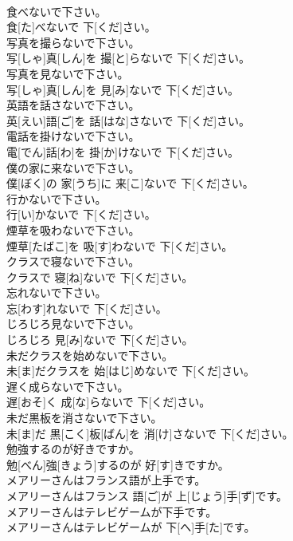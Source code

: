 \documentclass[8pt]{extreport}
\begin{document}
\begin{CJK}{UTF8}{min}
\\	食べないで下さい。	
\\	食[た]べないで 下[くだ]さい。
\\	写真を撮らないで下さい。	
\\	写[しゃ]真[しん]を 撮[と]らないで 下[くだ]さい。
\\	写真を見ないで下さい。	
\\	写[しゃ]真[しん]を 見[み]ないで 下[くだ]さい。
\\	英語を話さないで下さい。	
\\	英[えい]語[ご]を 話[はな]さないで 下[くだ]さい。
\\	電話を掛けないで下さい。	
\\	電[でん]話[わ]を 掛[か]けないで 下[くだ]さい。
\\	僕の家に来ないで下さい。	
\\	僕[ぼく]の 家[うち]に 来[こ]ないで 下[くだ]さい。
\\	行かないで下さい。	
\\	行[い]かないで 下[くだ]さい。
\\	煙草を吸わないで下さい。	
\\	煙草[たばこ]を 吸[す]わないで 下[くだ]さい。
\\	クラスで寝ないで下さい。	
\\	クラスで 寝[ね]ないで 下[くだ]さい。
\\	忘れないで下さい。	
\\	忘[わす]れないで 下[くだ]さい。
\\	じろじろ見ないで下さい。	
\\	じろじろ 見[み]ないで 下[くだ]さい。
\\	未だクラスを始めないで下さい。	
\\	未[ま]だクラスを 始[はじ]めないで 下[くだ]さい。
\\	遅く成らないで下さい。	
\\	遅[おそ]く 成[な]らないで 下[くだ]さい。
\\	未だ黒板を消さないで下さい。	
\\	未[ま]だ 黒[こく]板[ばん]を 消[け]さないで 下[くだ]さい。
\\	勉強するのが好きですか。	
\\	勉[べん]強[きょう]するのが 好[す]きですか。
\\	メアリーさんはフランス語が上手です。	
\\	メアリーさんはフランス 語[ご]が 上[じょう]手[ず]です。
\\	メアリーさんはテレビゲームが下手です。	
\\	メアリーさんはテレビゲームが 下[へ]手[た]です。

\end{CJK}
\end{document}
